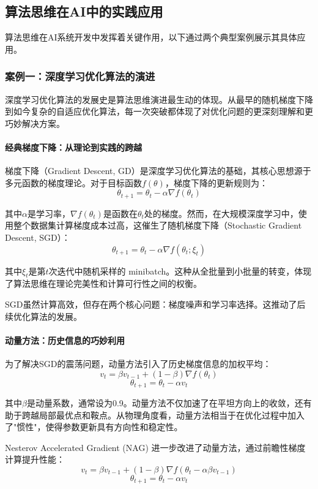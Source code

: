 \subsection{算法思维在AI中的实践应用}

算法思维在AI系统开发中发挥着关键作用，以下通过两个典型案例展示其具体应用。

\subsubsection{案例一：深度学习优化算法的演进}

深度学习优化算法的发展史是算法思维演进最生动的体现。从最早的随机梯度下降到如今复杂的自适应优化算法，每一次突破都体现了对优化问题的更深刻理解和更巧妙解决方案。

\paragraph{经典梯度下降：从理论到实践的跨越}
梯度下降（Gradient Descent, GD）是深度学习优化算法的基础，其核心思想源于多元函数的梯度理论。对于目标函数$f(\theta)$，梯度下降的更新规则为：
$$\theta_{t+1} = \theta_t - \alpha \nabla f(\theta_t)$$

其中$\alpha$是学习率，$\nabla f(\theta_t)$是函数在$\theta_t$处的梯度。然而，在大规模深度学习中，使用整个数据集计算梯度成本过高，这催生了随机梯度下降（Stochastic Gradient Descent, SGD）：
$$\theta_{t+1} = \theta_t - \alpha \nabla f(\theta_t; \xi_t)$$

其中$\xi_t$是第$t$次迭代中随机采样的 minibatch。这种从全批量到小批量的转变，体现了算法思维在理论完美性和计算可行性之间的权衡。

SGD虽然计算高效，但存在两个核心问题：梯度噪声和学习率选择。这推动了后续优化算法的发展。

\paragraph{动量方法：历史信息的巧妙利用}
为了解决SGD的震荡问题，动量方法引入了历史梯度信息的加权平均：
$$v_t = \beta v_{t-1} + (1-\beta) \nabla f(\theta_t)$$
$$\theta_{t+1} = \theta_t - \alpha v_t$$

其中$\beta$是动量系数，通常设为0.9。动量方法不仅加速了在平坦方向上的收敛，还有助于跨越局部最优点和鞍点。从物理角度看，动量方法相当于在优化过程中加入了"惯性"，使得参数更新具有方向性和稳定性。

Nesterov Accelerated Gradient (NAG) 进一步改进了动量方法，通过前瞻性梯度计算提升性能：
$$v_t = \beta v_{t-1} + (1-\beta) \nabla f(\theta_t - \alpha \beta v_{t-1})$$
$$\theta_{t+1} = \theta_t - \alpha v_t$$

